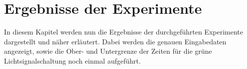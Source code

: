 %


\section{Ergebnisse der Experimente}\label{sec:results}

In diesem Kapitel werden nun die Ergebnisse der durchgeführten Experimente dargestellt und näher erläutert.
Dabei werden die genauen Eingabedaten angezeigt, sowie die Ober- und Untergrenze der Zeiten für die grüne Lichtsignalschaltung noch einmal aufgeführt.












